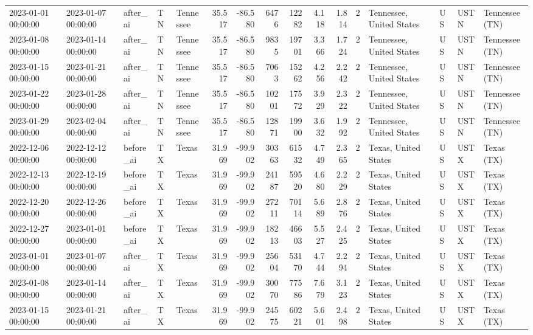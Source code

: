 \begin{tabular}{lllllrrrrrrlllll}
2023-01-01 00:00:00 & 2023-01-07 00:00:00 & after\_ai & TN & Tennessee & 35.517 & -86.580 & 6476 & 12282 & 4.118 & 1.814 & 2 & Tennessee, United States & US & USTN & Tennessee (TN) \\
2023-01-08 00:00:00 & 2023-01-14 00:00:00 & after\_ai & TN & Tennessee & 35.517 & -86.580 & 9835 & 19701 & 3.366 & 1.724 & 2 & Tennessee, United States & US & USTN & Tennessee (TN) \\
2023-01-15 00:00:00 & 2023-01-21 00:00:00 & after\_ai & TN & Tennessee & 35.517 & -86.580 & 7063 & 15262 & 4.256 & 2.242 & 2 & Tennessee, United States & US & USTN & Tennessee (TN) \\
2023-01-22 00:00:00 & 2023-01-28 00:00:00 & after\_ai & TN & Tennessee & 35.517 & -86.580 & 10201 & 17572 & 3.929 & 2.322 & 2 & Tennessee, United States & US & USTN & Tennessee (TN) \\
2023-01-29 00:00:00 & 2023-02-04 00:00:00 & after\_ai & TN & Tennessee & 35.517 & -86.580 & 12871 & 19900 & 3.632 & 1.992 & 2 & Tennessee, United States & US & USTN & Tennessee (TN) \\
2022-12-06 00:00:00 & 2022-12-12 00:00:00 & before\_ai & TX & Texas & 31.969 & -99.902 & 30363 & 61532 & 4.749 & 2.365 & 2 & Texas, United States & US & USTX & Texas (TX) \\
2022-12-13 00:00:00 & 2022-12-19 00:00:00 & before\_ai & TX & Texas & 31.969 & -99.902 & 24187 & 59520 & 4.680 & 2.229 & 2 & Texas, United States & US & USTX & Texas (TX) \\
2022-12-20 00:00:00 & 2022-12-26 00:00:00 & before\_ai & TX & Texas & 31.969 & -99.902 & 27211 & 70114 & 5.689 & 2.876 & 2 & Texas, United States & US & USTX & Texas (TX) \\
2022-12-27 00:00:00 & 2023-01-01 00:00:00 & before\_ai & TX & Texas & 31.969 & -99.902 & 18213 & 46603 & 5.527 & 2.425 & 2 & Texas, United States & US & USTX & Texas (TX) \\
2023-01-01 00:00:00 & 2023-01-07 00:00:00 & after\_ai & TX & Texas & 31.969 & -99.902 & 25604 & 53170 & 4.744 & 2.294 & 2 & Texas, United States & US & USTX & Texas (TX) \\
2023-01-08 00:00:00 & 2023-01-14 00:00:00 & after\_ai & TX & Texas & 31.969 & -99.902 & 30070 & 77586 & 7.679 & 3.123 & 2 & Texas, United States & US & USTX & Texas (TX) \\
2023-01-15 00:00:00 & 2023-01-21 00:00:00 & after\_ai & TX & Texas & 31.969 & -99.902 & 24575 & 60221 & 5.601 & 2.498 & 2 & Texas, United States & US & USTX & Texas (TX) \\

\end{tabular}
